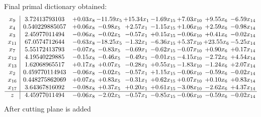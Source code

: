 \documentclass[8pt]{article}
\begin{document}
 Final primal dictionary obtained: 
\[\begin{array}{c| c c@{\hskip 2pt} c@{\hskip 2pt} c@{\hskip 2pt} c@{\hskip 2pt} c@{\hskip 2pt} c@{\hskip 2pt} c@{\hskip 2pt} }
 x_{9}   &  3.72413793103 & +  0.03 x_{8} & -11.59 x_{5} & + 15.34 x_{1} & -1.69 x_{15} & +  7.03 x_{10} & +  9.55 x_{6} & -6.59 x_{14}\\
 x_{4}   &  0.540229885057 & +  0.06 x_{8} & -0.98 x_{5} & +  2.57 x_{1} & -1.15 x_{15} & +  1.06 x_{10} & +  2.59 x_{6} & -0.98 x_{14}\\
 x_{3}   &  2.45977011494 & -0.06 x_{8} & -0.02 x_{5} & -0.57 x_{1} & +  0.15 x_{15} & -0.06 x_{10} & +  0.41 x_{6} & -0.02 x_{14}\\
 x_{11}   &  67.0574712644 & -0.63 x_{8} & -18.25 x_{5} & -1.32 x_{1} & -6.36 x_{15} & +  5.37 x_{10} & + 23.55 x_{6} & -5.25 x_{14}\\
 x_{7}   &  5.55172413793 & -0.07 x_{8} & -0.83 x_{5} & -0.69 x_{1} & -0.62 x_{15} & -0.07 x_{10} & +  0.90 x_{6} & +  0.17 x_{14}\\
 x_{12}   &  4.19540229885 & -0.15 x_{8} & -0.46 x_{5} & -0.49 x_{1} & -0.01 x_{15} & -4.15 x_{10} & -2.72 x_{6} & +  4.54 x_{14}\\
 x_{13}   &  1.62068965517 & +  0.17 x_{8} & +  0.07 x_{5} & -0.28 x_{1} & +  0.55 x_{15} & -1.83 x_{10} & -1.24 x_{6} & +  2.07 x_{14}\\
 x_{2}   &  0.459770114943 & -0.06 x_{8} & -0.02 x_{5} & -0.57 x_{1} & +  1.15 x_{15} & -0.06 x_{10} & -0.59 x_{6} & -0.02 x_{14}\\
 x_{16}   &  0.448275862069 & +  0.07 x_{8} & +  0.83 x_{5} & -0.31 x_{1} & +  0.62 x_{15} & +  0.07 x_{10} & +  0.10 x_{6} & +  0.83 x_{14}\\
 x_{17}   &  3.64367816092 & -0.08 x_{8} & +  0.37 x_{5} & +  0.20 x_{1} & +  0.61 x_{15} & -3.08 x_{10} & -2.62 x_{6} & +  4.37 x_{14}\\
\hline
z    &  4.45977011494 & -0.06 x_{8} & -2.02 x_{5} & -0.57 x_{1} & -0.85 x_{15} & -0.06 x_{10} & -0.59 x_{6} & -0.02 x_{14}\\
\end{array}\]
 After cutting plane is added 
\end{document}
